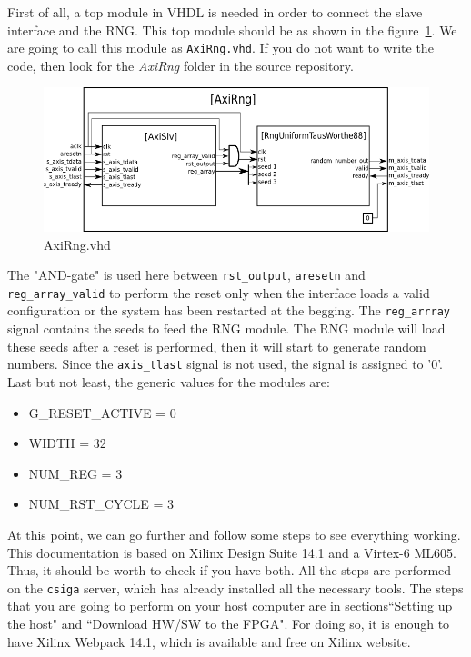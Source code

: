 First of all, a top module in VHDL is needed in order to connect the slave interface and the RNG. This top module should be as shown in the figure~\ref{f3}. We are going to call this module as {\tt AxiRng.vhd}. If you do not want to write the code, then look for the {\it AxiRng} folder in the source repository.

\begin{figure}[!h]
\includegraphics[scale=0.5]{images/axiRngBlock.png}
\caption{AxiRng.vhd}
\label{f3}
\end{figure}

The "AND-gate" is used here between {\tt rst\_output}, {\tt aresetn} and {\tt reg\_array\_valid} to perform the reset only when the interface loads a valid configuration or the system has been restarted at the begging. The {\tt reg\_arrray} signal contains the seeds to feed the RNG module. The RNG module will load these seeds after a reset is performed, then it will start to generate random numbers. Since the {\tt axis\_tlast} signal is not used, the signal is assigned to '0'. Last but not least, the generic values for the modules are:

\begin{itemize}
\item G\_RESET\_ACTIVE = 0
\item WIDTH = 32
\item NUM\_REG = 3
\item NUM\_RST\_CYCLE = 3
\end{itemize}

At this point, we can go further and follow some steps to see everything working. This documentation is based on Xilinx Design Suite 14.1 and a Virtex-6 ML605. Thus, it should be worth to check if you have both. All the steps are performed on the {\tt csiga} server, which has already installed all the necessary tools. The steps that you are going to perform on your host computer are in sections``Setting up the host" and ``Download HW/SW to the FPGA". For doing so, it is enough to have Xilinx Webpack 14.1, which is available and free on Xilinx website.


